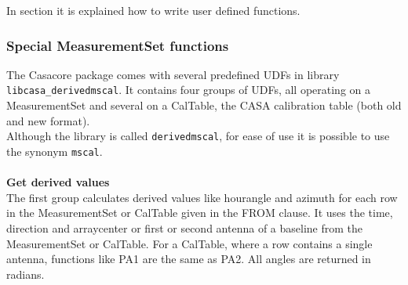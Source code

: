 In section
 it is
explained how to write user defined functions.

\subsubsection{\label{TAQL:MSFUNC}Special MeasurementSet functions}
The Casacore package comes with several predefined UDFs in library
\texttt{libcasa\_derivedmscal}. It contains four groups of UDFs,
all operating on a MeasurementSet and several on a CalTable, the CASA calibration
table (both old and new format).  
\\Although the library is called \texttt{derivedmscal}, for ease of
use it is possible to use the synonym \texttt{mscal}. 

\paragraph*{}
{\bf Get derived values}
\\The first group calculates derived values like hourangle and azimuth
for each row in the MeasurementSet or CalTable given in the FROM clause.
It uses the time, direction and arraycenter or first or second antenna
of a baseline from the MeasurementSet or CalTable.
For a CalTable, where a row contains a single antenna, 
functions like PA1 are the same as PA2. 
All angles are returned in radians.
